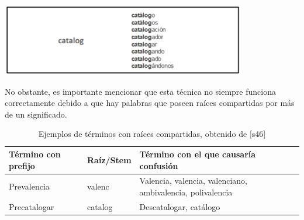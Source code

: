 \begin{enumerate}
\begin{center}
    \includegraphics[width=0.8\textwidth]{Images/catalog.png}
\end{center}
No obstante, es importante mencionar que esta técnica no siempre funciona correctamente debido a que hay palabras que poseen raíces compartidas por más de un significado. 
\begin{table}[h]
    \centering
    \begin{tabular}{|p{4cm}|p{3cm}|p{5cm}|}
        \hline
        \textbf{Término con prefijo} & \textbf{Raíz/Stem} & \textbf{Término con el que causaría confusión} \\
        \hline
        Prevalencia & valenc & Valencia, valencia, valenciano, ambivalencia, polivalencia \\
        \hline
        Precatalogar & catalog & Descatalogar, catálogo \\
        \hline
    \end{tabular}
    \caption{Ejemplos de términos con raíces compartidas, obtenido de [s46]}
    \label{tabla:confusion}
\end{table}

\end{enumerate}

